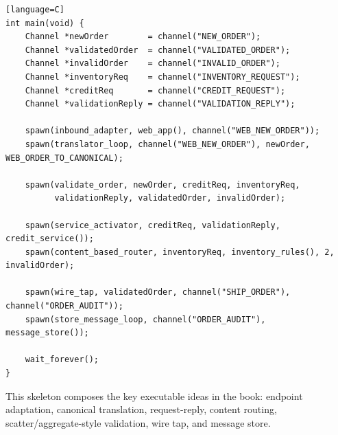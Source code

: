 \documentclass[11pt]{article}
\begin{document}
\begin{verbatim}[language=C]
int main(void) {
    Channel *newOrder        = channel("NEW_ORDER");
    Channel *validatedOrder  = channel("VALIDATED_ORDER");
    Channel *invalidOrder    = channel("INVALID_ORDER");
    Channel *inventoryReq    = channel("INVENTORY_REQUEST");
    Channel *creditReq       = channel("CREDIT_REQUEST");
    Channel *validationReply = channel("VALIDATION_REPLY");

    spawn(inbound_adapter, web_app(), channel("WEB_NEW_ORDER"));
    spawn(translator_loop, channel("WEB_NEW_ORDER"), newOrder, WEB_ORDER_TO_CANONICAL);

    spawn(validate_order, newOrder, creditReq, inventoryReq,
          validationReply, validatedOrder, invalidOrder);

    spawn(service_activator, creditReq, validationReply, credit_service());
    spawn(content_based_router, inventoryReq, inventory_rules(), 2, invalidOrder);

    spawn(wire_tap, validatedOrder, channel("SHIP_ORDER"), channel("ORDER_AUDIT"));
    spawn(store_message_loop, channel("ORDER_AUDIT"), message_store());

    wait_forever();
}
\end{verbatim}

This skeleton composes the key executable ideas in the book: endpoint
adaptation, canonical translation, request-reply, content routing,
scatter/aggregate-style validation, wire tap, and message store.
\end{document}
